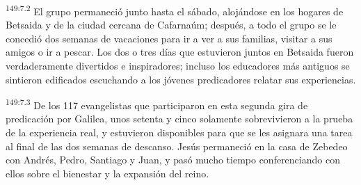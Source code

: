 \par 
\textsuperscript{149:7.2} El grupo permaneció junto hasta el sábado, alojándose en los hogares de Betsaida y de la ciudad cercana de Cafarnaúm; después, a todo el grupo se le concedió dos semanas de vacaciones para ir a ver a sus familias, visitar a sus amigos o ir a pescar. Los dos o tres días que estuvieron juntos en Betsaida fueron verdaderamente divertidos e inspiradores; incluso los educadores más antiguos se sintieron edificados escuchando a los jóvenes predicadores relatar sus experiencias.

\par 
\textsuperscript{149:7.3} De los 117 evangelistas que participaron en esta segunda gira de predicación por Galilea, unos setenta y cinco solamente sobrevivieron a la prueba de la experiencia real, y estuvieron disponibles para que se les asignara una tarea al final de las dos semanas de descanso. Jesús permaneció en la casa de Zebedeo con Andrés, Pedro, Santiago y Juan, y pasó mucho tiempo conferenciando con ellos sobre el bienestar y la expansión del reino.